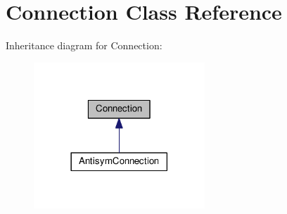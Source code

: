 \hypertarget{classConnection}{}\section{Connection Class Reference}
\label{classConnection}


Inheritance diagram for Connection\+:\nopagebreak
\begin{figure}[H]
\begin{center}
\leavevmode
\includegraphics[width=182pt]{classConnection__inherit__graph}
\end{center}
\end{figure}
